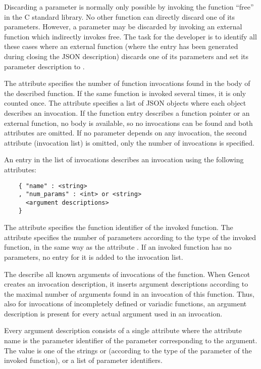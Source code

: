 Discarding a parameter is normally only possible by invoking the function ``free'' in the C standard library. No other function
can directly discard one of its parameters. However, a parameter may be discarded by invoking an external function which indirectly
invokes free. The task for the developer is to identify all these cases where an external function (where the entry has been
generated during closing the JSON description) discards one of its parameters and set its parameter description to .

The attribute  specifies the number of function invocations found in the body of the described function.
If the same function is invoked several times, it is only counted once. The attribute  specifies a list
of JSON objects where each object describes an invocation. If the function entry describes a function pointer or an external
function, no body is available, so no invocations can be found and both attributes are omitted. If no parameter depends on
any invocation, the second attribute (invocation list) is omitted, only the number of invocations is specified.

An entry in the list of invocations describes an invocation using the following attributes:
\begin{verbatim}
    { "name" : <string> 
    , "num_params" : <int> or <string>
      <argument descriptions>
    }
\end{verbatim}

The attribute  specifies the function identifier of the invoked function. The attribute 
specifies the number of parameters according to the type of the invoked function, in the same way as the attribute
. If an invoked function has no parameters, no entry for it is added to the invocation list.

The  describe all known arguments of invocations of the function. When Gencot creates an
invocation description, it inserts argument descriptions according to the maximal number of arguments found in an 
invocation of this function. Thus, also for invocations of incompletely defined or variadic functions, an argument
description is present for every actual argument used in an invocation.

Every argument description consists of a single attribute where the attribute name is the parameter identifier of the 
parameter corresponding to the argument. The value is one of the strings  or 
(according to the type of the parameter of the invoked function), or a list of parameter identifiers.

